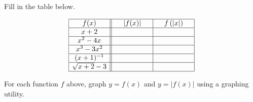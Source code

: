 \documentclass{ximera}
\begin{document}
\begin{question}
Fill in the table below.

\[ \begin{array}{|c||c|c|}

\hline

f(x) & |f(x)| & f\left(|x| \right)  \\ \hline

x+2 &      \hphantom{\sqrt{x+3}-2}   &         \hphantom{\sqrt{x+3}-2}      \\ \hline

x^2-4x &      \hphantom{\sqrt{x+3}-2}      &      \hphantom{\sqrt{x+3}-2}       \\  \hline

x^3-3x^2 &     \hphantom{\sqrt{x+3}-2}       &    \hphantom{\sqrt{x+3}-2}       \\  \hline  

(x+1)^{-1}  &      \hphantom{\sqrt{x+3}-2}      &    \hphantom{\sqrt{x+3}-2}       \\  \hline   

\sqrt{x+2}-3&    \hphantom{\sqrt{x+3}-2}        &     \hphantom{\sqrt{x+3}-2}      \\  \hline   

 \end{array} \]
 








\end{question}

\begin{question}
For each function $f$ above, graph $y = f(x)$ and $y=|f(x)|$ using a graphing utility.

\end{question}
\end{document}
